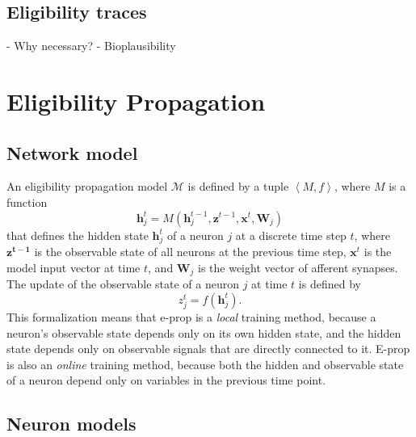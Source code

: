     \subsection{Eligibility traces}
        \begin{tcolorbox}[colback=orange]
        - Why necessary?
        - Bioplausibility


        \end{tcolorbox}

\section{Eligibility Propagation}

    \subsection{Network model}
        An eligibility propagation model $\mathcal{M}$ is defined by a tuple $\left<M, f\right>$,
        where $M$ is a function
        \begin{equation}\label{eq:model}
        \mathbf{h}^t_j = M\left(\mathbf{h}_j^{t-1}, \mathbf{z}^{t-1}, \mathbf{x}^t, \mathbf{W}_j\right)
        \end{equation}
        that defines the hidden state $\mathbf{h}_j^t$ of a neuron $j$ at a discrete time step $t$, where $\mathbf{z^{t-1}}$ is the observable state of all neurons at the previous time step, $\mathbf{x}^t$ is the model input vector at time $t$, and $\mathbf{W}_j$ is the weight vector of afferent synapses.
        The update of the observable state of a neuron $j$ at time $t$ is defined by
        \begin{equation}
        z^t_j = f\left(\mathbf{h}_j^t\right).
        \end{equation}
        This formalization means that e-prop is a \emph{local} training method, because a neuron's observable state depends only on its own hidden state, and the hidden state depends only on observable signals that are directly connected to it.
        E-prop is also an \emph{online} training method, because both the hidden and observable state of a neuron depend only on variables in the previous time point.

    \subsection{Neuron models}\label{sec:alif}

